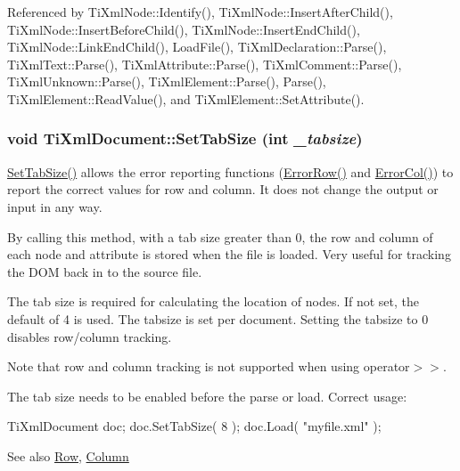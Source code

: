Referenced by TiXmlNode::Identify(), TiXmlNode::InsertAfterChild(), TiXmlNode::InsertBeforeChild(), TiXmlNode::InsertEndChild(), TiXmlNode::LinkEndChild(), LoadFile(), TiXmlDeclaration::Parse(), TiXmlText::Parse(), TiXmlAttribute::Parse(), TiXmlComment::Parse(), TiXmlUnknown::Parse(), TiXmlElement::Parse(), Parse(), TiXmlElement::ReadValue(), and TiXmlElement::SetAttribute().\hypertarget{class_ti_xml_document_a51dac56316f89b35bdb7d0d433ba988e}{
\subsubsection[{SetTabSize}]{\setlength{\rightskip}{0pt plus 5cm}void TiXmlDocument::SetTabSize (int {\em \_\-tabsize})}}
\label{class_ti_xml_document_a51dac56316f89b35bdb7d0d433ba988e}
\hyperlink{class_ti_xml_document_a51dac56316f89b35bdb7d0d433ba988e}{SetTabSize()} allows the error reporting functions (\hyperlink{class_ti_xml_document_af30efc75e804aa2e92fb8be3a8cb676e}{ErrorRow()} and \hyperlink{class_ti_xml_document_aa90bc630ee5203c6109ca5fad3323649}{ErrorCol()}) to report the correct values for row and column. It does not change the output or input in any way.

By calling this method, with a tab size greater than 0, the row and column of each node and attribute is stored when the file is loaded. Very useful for tracking the DOM back in to the source file.

The tab size is required for calculating the location of nodes. If not set, the default of 4 is used. The tabsize is set per document. Setting the tabsize to 0 disables row/column tracking.

Note that row and column tracking is not supported when using operator$>$$>$.

The tab size needs to be enabled before the parse or load. Correct usage: \begin{DoxyVerb}
      TiXmlDocument doc;
      doc.SetTabSize( 8 );
      doc.Load( "myfile.xml" );
      \end{DoxyVerb}


\begin{DoxySeeAlso}{See also}
\hyperlink{class_ti_xml_base_a024bceb070188df92c2a8d8852dd0853}{Row}, \hyperlink{class_ti_xml_base_ab54bfb9b70fe6dd276e7b279cab7f003}{Column} 
\end{DoxySeeAlso}


